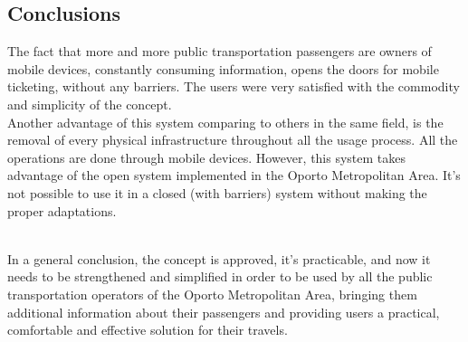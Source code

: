\documentclass[9pt,a4paper]{extarticle}
\begin{document}
\begin{multicols}{2}
\section{Conclusions}\label{sec:conclui}

The fact that more and more public transportation passengers are owners of mobile devices, constantly consuming information, opens the doors for mobile ticketing, without any barriers. The users were very satisfied with the commodity and simplicity of the concept.
\\Another advantage of this system comparing to others in the same field, is the removal of every physical infrastructure throughout all the usage process. All the operations are done through mobile devices. However, this system takes advantage of the open system implemented in the Oporto Metropolitan Area. It’s not possible to use it in a closed (with barriers) system without making the proper adaptations.

~\\In a general conclusion, the concept is approved, it’s practicable, and now it needs to be strengthened and simplified in order to be used by all the public transportation operators of the Oporto Metropolitan Area, bringing them additional information about their passengers and providing users a practical, comfortable and effective solution for their travels.



\end{multicols}
\end{document}
